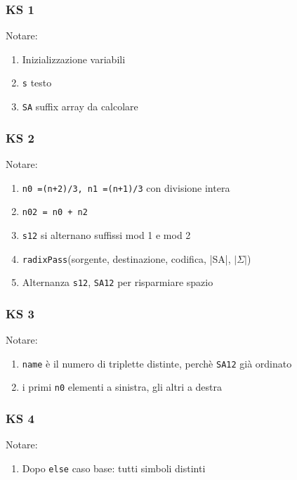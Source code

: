 \begin{frame}[fragile]
\frametitle{KS 1}

\begin{block}{Notare:}
\begin{enumerate}
\item
Inizializzazione variabili
\item
\lstinline!s! testo
\item
\lstinline!SA! suffix array da calcolare
\end{enumerate}
\end{block}
\end{frame}

\begin{frame}[fragile]
\frametitle{KS 2}

\begin{block}{Notare:}
\begin{enumerate}
\item
\lstinline!n0 =(n+2)/3, n1 =(n+1)/3! con divisione intera
\item
\lstinline!n02 = n0 + n2!
\item
\lstinline!s12! si alternano suffissi mod 1 e mod 2
\item
\lstinline!radixPass!(sorgente, destinazione, codifica, |SA|, $|\Sigma|$)
\item
Alternanza \lstinline!s12!, \lstinline!SA12! per risparmiare spazio
\end{enumerate}
\end{block}
\end{frame}

\begin{frame}[fragile]
\frametitle{KS 3}

\begin{block}{Notare:}
\begin{enumerate}
\item
\lstinline!name! è il numero di triplette distinte,
perchè \lstinline!SA12! già ordinato
\item
i primi \lstinline!n0! elementi a sinistra, gli altri a destra
\end{enumerate}
\end{block}
\end{frame}

\begin{frame}[fragile]
\frametitle{KS 4}

\begin{block}{Notare:}
\begin{enumerate}
\item
Dopo \lstinline!else! caso base: tutti simboli distinti
\end{enumerate}
\end{block}
\end{frame}

